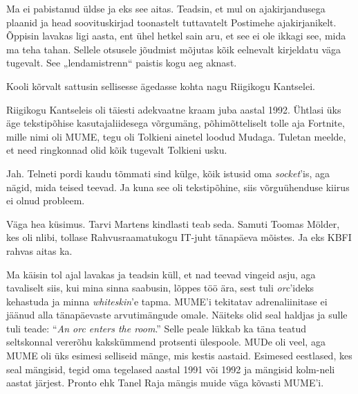Ma ei pabistanud üldse ja eks see aitas. Teadsin, et mul on
ajakirjandusega plaanid ja head soovituskirjad 
toonastelt tuttavatelt Postimehe ajakirjanikelt. Õppisin 
lavakas ligi aasta, ent ühel hetkel sain aru, et see ei ole ikkagi see, mida ma teha tahan. 
Sellele otsusele jõudmist mõjutas kõik eelnevalt kirjeldatu 
väga tugevalt. See „lendamistrenn“ paistis kogu aeg aknast. 

Kooli kõrvalt sattusin sellisesse ägedasse kohta nagu Riigikogu 
Kantselei.


Riigikogu Kantseleis oli täiesti adekvaatne kraam juba aastal 1992. 
Ühtlasi üks äge tekstipõhise kasutajaliidesega võrgumäng, 
põhimõtteliselt tolle aja Fortnite, mille nimi oli 
MUME, tegu oli Tolkieni ainetel loodud 
Mudaga. Tuletan meelde, et need ringkonnad olid kõik 
tugevalt Tolkieni usku.


Jah. Telneti pordi kaudu tõmmati sind külge, kõik istusid oma 
\emph{socket}'is, aga nägid, mida teised teevad. Ja kuna see oli 
tekstipõhine, siis võrguühenduse kiirus ei olnud probleem.


Väga hea küsimus. Tarvi 
Martens kindlasti teab seda. Samuti
Toomas Mölder, kes oli nlibi, 
tollase Rahvusraamatukogu IT-juht tänapäeva mõistes. Ja eks KBFI rahvas aitas ka.


Ma käisin tol ajal lavakas ja teadsin küll, et nad teevad 
vingeid asju, aga tavaliselt siis, kui mina sinna saabusin, 
lõppes töö ära, sest tuli \emph{orc}'ideks kehastuda ja minna 
\emph{whiteskin}'e tapma. MUME'i tekitatav adrenaliinitase ei jäänud alla 
tänapäevaste arvutimängude omale. Näiteks olid seal haldjas ja sulle tuli 
teade: \enquote{\emph{An orc enters the room}.} Selle peale lükkab ka täna teatud 
seltskonnal vererõhu kakskümmend protsenti ülespoole. MUDe oli veel, aga 
MUME oli üks esimesi selliseid mänge, mis kestis aastaid. Esimesed 
eestlased, kes seal mängisid, tegid oma tegelased aastal 1991 või 1992 ja mängisid kolm-neli aastat järjest. Pronto ehk Tanel Raja mängis muide 
väga kõvasti MUME'i. 

